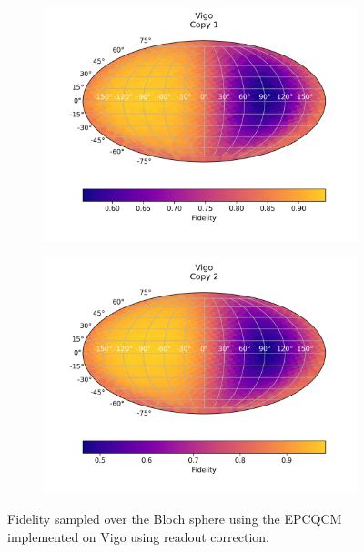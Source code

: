   \begin{figure}[H]
    \centering
    \begin{subfigure}{.5\textwidth}
      \centering
      \includegraphics[width=\textwidth]{Figures/Economical/IBM/FullSphere/results_vigo_copy1.png}
      
      \label{fig:epc_uncorrected_vigo_sphere_1}
    \end{subfigure}%
    \begin{subfigure}{.5\textwidth}
      \centering
      \includegraphics[width=\textwidth]{Figures/Economical/IBM/FullSphere/results_vigo_copy2.png}
      
      \label{fig:epc_uncorrected_vigo_sphere_2}
    \end{subfigure}
    \caption{Fidelity sampled over the Bloch sphere using the EPCQCM implemented on Vigo using readout correction.}
    \label{fig:epc_uncorrected_vigo_sphere}
  \end{figure}
  

